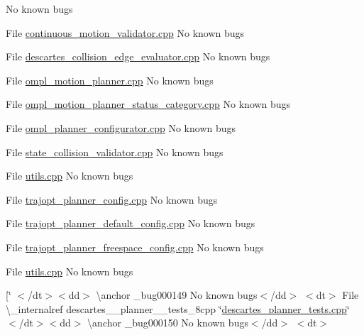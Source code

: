 \begin{DoxyRefList}
%
No known bugs 
\item[File \mbox{\hyperlink{continuous__motion__validator_8cpp}{continuous\+\_\+motion\+\_\+validator.cpp}} ]\label{bug__bug000138}%
%
No known bugs 
\item[File \mbox{\hyperlink{descartes__collision__edge__evaluator_8cpp}{descartes\+\_\+collision\+\_\+edge\+\_\+evaluator.cpp}} ]\label{bug__bug000126}%
%
No known bugs 
\item[File \mbox{\hyperlink{ompl__motion__planner_8cpp}{ompl\+\_\+motion\+\_\+planner.cpp}} ]\label{bug__bug000140}%
%
No known bugs 
\item[File \mbox{\hyperlink{ompl__motion__planner__status__category_8cpp}{ompl\+\_\+motion\+\_\+planner\+\_\+status\+\_\+category.cpp}} ]\label{bug__bug000141}%
%
No known bugs 
\item[File \mbox{\hyperlink{ompl__planner__configurator_8cpp}{ompl\+\_\+planner\+\_\+configurator.cpp}} ]\label{bug__bug000142}%
%
No known bugs 
\item[File \mbox{\hyperlink{state__collision__validator_8cpp}{state\+\_\+collision\+\_\+validator.cpp}} ]\label{bug__bug000143}%
%
No known bugs 
\item[File \mbox{\hyperlink{ompl_2utils_8cpp}{utils.cpp}} ]\label{bug__bug000144}%
%
No known bugs 
\item[File \mbox{\hyperlink{trajopt__planner__config_8cpp}{trajopt\+\_\+planner\+\_\+config.cpp}} ]\label{bug__bug000145}%
%
No known bugs 
\item[File \mbox{\hyperlink{trajopt__planner__default__config_8cpp}{trajopt\+\_\+planner\+\_\+default\+\_\+config.cpp}} ]\label{bug__bug000146}%
%
No known bugs 
\item[File \mbox{\hyperlink{trajopt__planner__freespace__config_8cpp}{trajopt\+\_\+planner\+\_\+freespace\+\_\+config.cpp}} ]\label{bug__bug000147}%
%
No known bugs 
\item[File \mbox{\hyperlink{trajopt_2config_2utils_8cpp}{utils.cpp}} ]\label{bug__bug000148}%
%
No known bugs 
\item[\char`\"{} $<$/dt$>$$<$dd$>$ \textbackslash{}anchor \+\_\+bug000149 No known bugs$<$/dd$>$ $<$dt$>$
\+File \textbackslash{}\+\_\+internalref descartes\+\_\+\+\_\+planner\+\_\+\+\_\+tests\+\_\+8cpp \char`\"{}\mbox{\hyperlink{descartes__planner__tests_8cpp}{descartes\+\_\+planner\+\_\+tests.\+cpp}}\char`\"{} $<$/dt$>$$<$dd$>$ \textbackslash{}anchor \+\_\+bug000150 No known bugs$<$/dd$>$ $<$dt$>$

\end{DoxyRefList}
